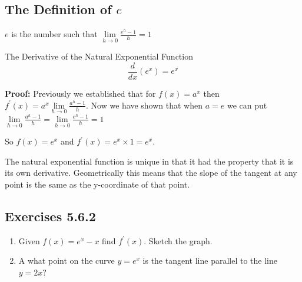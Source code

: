 \subsection{The Definition of $e$}
$e$ is the number such that $\underset{h \rightarrow 0}{\lim }\frac{e^{h} -1}{h} =1$ 

The Derivative of the Natural Exponential Function
\begin{equation*}\frac{d}{d x} \left (e^{x}\right ) =e^{x}
\end{equation*}

\textbf{Proof:} Previously we established that for $f (x) =a^{x}$ then $f^{ \prime } (x) =a^{x} \underset{h \rightarrow 0}{\lim }\frac{a^{h} -1}{h}$. Now we have shown that when $a =e$ we can put $\underset{h \rightarrow 0}{\lim }\frac{a^{h} -1}{h} =\underset{h \rightarrow 0}{\lim }\frac{e^{h} -1}{h} =1$ 

So $f (x) =e^{x}$ and $f^{ \prime } (x) =e^{x} \times 1 =e^{x}$. 

\bigskip The natural exponential function is unique in that it had the property that
it is its own derivative. Geometrically this means that the slope of the tangent at any point is the same as
the y-coordinate of that point. 

\subsection{Exercises 5.6.2}
\begin{enumerate}
\item Given $f (x) =e^{x} -x$ find $f^{ \prime } (x)$. Sketch the graph. 

\item A
what point on the curve $y =e^{x}$ is the tangent line parallel to the line $y =2 x$? \end{enumerate}


